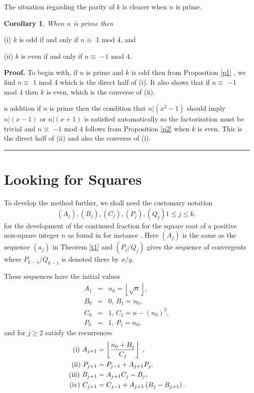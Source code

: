 \documentclass[12pt]{article}
\newtheorem{corollary}[theorem]{Corollary}
\newenvironment{proof}[1][Proof]{\textbf{#1.} }{\ \rule{0.5em}{0.5em}}
\begin{document}
The situation regarding the parity of $k$ is clearer when $n$ is prime.

\begin{corollary}
\label{t4}When $n$ is prime then
\end{corollary}

(i) $k$ is odd if and only if $n\equiv $ 1 mod 4, and

(ii) $k$ is even if and only if $n\equiv $ $-1$ mod 4.

\begin{proof}
To begin with, if $n$ is prime and $k$ is odd then from Proposition \ref{p1}%
, we find $n\equiv $ 1 mod 4 which is the direct half of (i). It also shows
that if $n\equiv $ $-1$ mod 4 then $k$ is even, which is the converse of
(ii).

n addition if $n$ is prime then the condition that $n|\left( x^{2}-1\right) $
should imply $n|\left( x-1\right) $ or $n|\left( x+1\right) $ is satisfied
automatically so the factorisation must be trivial and $n\equiv $ $-1$ mod 4
follows from Proposition \ref{p2} when $k$ is even. This is the direct half
of (ii) and also the converse of (i).
\end{proof}

\section{Looking for Squares\label{ls}}

To develop the method further, we shall need the customary notation 
\begin{equation*}
\left( A_{j}\right) ,\left( B_{j}\right) ,\left( C_{j}\right) ,\left(
P_{j}\right) ,\left( Q_{j}\right) 1\leq j\leq k,
\end{equation*}%
for the development of the continued fraction for the square root of a
positive non-square integer $n$ as found in for instance \cite[Ch. 10]%
{Bressoud:1989:IEF}. Here $\left( A_{j}\right) $ is the same as the sequence 
$\left( a_{j}\right) $ in Theorem \ref{t1} and $\left( P_{j}/Q_{j}\right) $
gives the sequence of convergents where $P_{k-1}/Q_{k-1}$ is denoted there
by $x/y$.

These sequences have the initial values 
\begin{eqnarray*}
A_{1} &=&n_{0}=\left\lfloor \sqrt{n}\right\rfloor , \\
B_{0} &=&0,\,B_{1}=n_{0}, \\
C_{0} &=&1,\,C_{1}=n-\left( n_{0}\right) ^{2}, \\
P_{0} &=&1,\,P_{1}=n_{0},
\end{eqnarray*}%
and for $j\geq 2$ satisfy the recurrences%
\begin{align}
\text{(i) }A_{j+1}& =\left\lfloor \frac{n_{0}+B_{j}}{C_{j}}\right\rfloor 
\text{ },  \label{ls1} \\
\text{(ii) }P_{j+1}& =P_{j-1}+A_{j+1}P_{j},  \notag \\
\text{(iii) }B_{j+1}& =A_{j+1}C_{j}-B_{j},  \notag \\
\text{(iv) }C_{j+1}& =C_{j-1}+A_{j+1}\left( B_{j}-B_{j+1}\right) .  \notag
\end{align}
\end{document}

